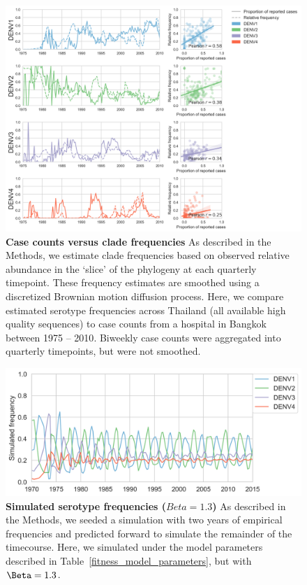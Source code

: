 \documentclass[11pt,oneside,letterpaper]{article}
\begin{document}
\begin{figure}[ht]
  \centering
  \includegraphics[width=\textwidth]{../figures/png/thai_frequencies_comparison.png}
  \caption{\textbf{Case counts versus clade frequencies}
  As described in the Methods, we estimate clade frequencies based on observed relative abundance in the `slice' of the phylogeny at each quarterly timepoint.
  These frequency estimates are smoothed using a discretized Brownian motion diffusion process.
  Here, we compare estimated serotype frequencies across Thailand (all available high quality sequences) to case counts from a hospital in Bangkok between 1975 -- 2010\citep{reich2013interactions}.
  Biweekly case counts were aggregated into quarterly timepoints, but were not smoothed.}
\label{thai_frequencies_comparison}
\end{figure}

\begin{figure}[ht]
  \centering
  \includegraphics[width=\textwidth]{../figures/png/simulated_frequencies_high_beta.png}
  \caption{\textbf{Simulated serotype frequencies ($Beta = 1.3$)}
  As described in the Methods, we seeded a simulation with two years of empirical frequencies and predicted forward to simulate the remainder of the timecourse.
  Here, we simulated under the model parameters described in Table~\ref{fitness_model_parameters}, but with $\Beta = 1.3$. }
\label{simulated_frequencies_high_beta}
\end{figure}
\end{document}
